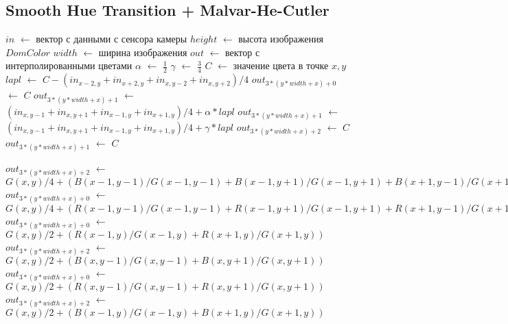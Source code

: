 \subsection{Smooth Hue Transition + Malvar-He-Cutler}
\begin{algorithm}[H]
	\caption{Smooth Hue Transition + Malvar-He-Cutler}
	\label{alg:mhc1}
	\begin{algorithmic}[1]
		\State $in$ $\gets$ вектор с данными с сенсора камеры
		\State $height$ $\gets$ высота изображения $DomColor$
		\State $width$ $\gets$ ширина изображения
		\State $out$ $\gets$ вектор с интерполированными цветами
		\State $\alpha$ $\gets$ $\frac{1}{2}$
		\State $\gamma$ $\gets$ $\frac{3}{4}$
		\State $C$ $\gets$ значение цвета в точке $x,y$
		\State $lapl$ $\gets$ $C - (in_{x-2, y} + in_{x+2, y} + in_{x, y-2} + in_{x, y+2}) / 4$
		\State $out_{3 * (y * width + x) + 0}$ $\gets$ $C$
		\State $out_{3 * (y * width + x) + 1}$ $\gets$ $(in_{x, y-1} + in_{x, y + 1} + in_{x - 1, y} + in_{x + 1, y}) / 4 + \alpha * lapl$
		\EndIf
		\State $out_{3 * (y * width + x) + 1}$ $\gets$ $(in_{x, y-1} + in_{x, y + 1} + in_{x - 1, y} + in_{x + 1, y}) / 4 + \gamma * lapl$
		\State $out_{3 * (y * width + x) + 2}$ $\gets$ $C$
		\EndIf
		\State $out_{3 * (y * width + x) + 1}$ $\gets$ $C$
		\EndIf
		\EndFor
		\EndFor
	\end{algorithmic}
\end{algorithm}
\clearpage
\begin{algorithm}
	\begin{algorithmic}[1]
		\State $out_{3 * (y * width + x) + 2}$ $\gets$ $G(x,y)/4 + (
		B(x-1,y-1)/G(x-1,y-1) +
		B(x-1,y+1)/G(x-1,y+1) +
		B(x+1,y-1)/G(x+1,y-1) +
		B(x+1,y+1)/G(x+1,y+1)
		)$
		\EndIf
		\State $out_{3 * (y * width + x) + 0}$ $\gets$ $G(x,y)/4 + (
		R(x-1,y-1)/G(x-1,y-1) +
		R(x-1,y+1)/G(x-1,y+1) +
		R(x+1,y-1)/G(x+1,y-1) +
		R(x+1,y+1)/G(x+1,y+1)
		)$
		\EndIf
		\State $out_{3 * (y * width + x) + 0}$ $\gets$ $G(x,y)/2 + (
		R(x-1,y)/G(x-1,y) +
		R(x+1,y)/G(x+1,y)
		)$
		\State $out_{3 * (y * width + x) + 2}$ $\gets$ $G(x,y)/2 + (
		B(x,y-1)/G(x,y-1) +
		B(x,y+1)/G(x,y+1)
		)$
		\EndIf
		\State $out_{3 * (y * width + x) + 0}$ $\gets$ $G(x,y)/2 + (
		R(x,y-1)/G(x,y-1) +
		R(x,y+1)/G(x,y+1)
		)$
		\State $out_{3 * (y * width + x) + 2}$ $\gets$ $G(x,y)/2 + (
		B(x-1,y)/G(x-1,y) +
		B(x+1,y)/G(x+1,y)
		)$
		\EndIf
		\EndFor
		\EndFor
	\end{algorithmic}
\end{algorithm}
\clearpage

